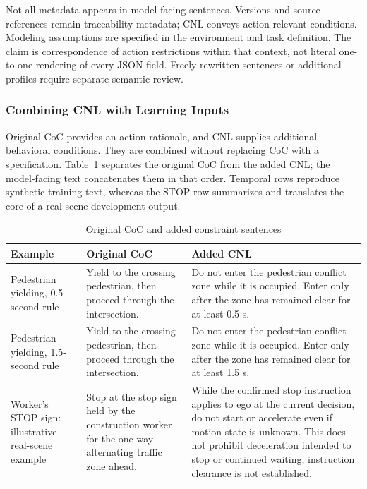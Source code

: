 \documentclass[nolineno]{ieeeaccess}
\begin{document}
Not all metadata appears in model-facing sentences. Versions and source references remain traceability metadata; CNL conveys action-relevant conditions. Modeling assumptions are specified in the environment and task definition. The claim is correspondence of action restrictions within that context, not literal one-to-one rendering of every JSON field. Freely rewritten sentences or additional profiles require separate semantic review.\par

\subsubsection{Combining CNL with Learning Inputs}

Original CoC provides an action rationale, and CNL supplies additional behavioral conditions. They are combined without replacing CoC with a specification. Table~\ref{tab:coc-cnl} separates the original CoC from the added CNL; the model-facing text concatenates them in that order. Temporal rows reproduce synthetic training text, whereas the STOP row summarizes and translates the core of a real-scene development output.\par


\begin{table}[tp]\caption{Original CoC and added constraint sentences}\label{tab:coc-cnl}
\centering\fontsize{8}{10}\selectfont\setlength{\tabcolsep}{3pt}
\begin{tabular}{@{}>{\raggedright\arraybackslash}p{}>{\raggedright\arraybackslash}p{}>{\raggedright\arraybackslash}p{}@{}}
\toprule
\textbf{Example} & \textbf{Original CoC} & \textbf{Added CNL}\\
\midrule
Pedestrian yielding, 0.5-second rule & Yield to the crossing pedestrian, then proceed through the intersection. & Do not enter the pedestrian conflict zone while it is occupied. Enter only after the zone has remained clear for at least 0.5 s.\\[3pt]
Pedestrian yielding, 1.5-second rule & Yield to the crossing pedestrian, then proceed through the intersection. & Do not enter the pedestrian conflict zone while it is occupied. Enter only after the zone has remained clear for at least 1.5 s.\\[3pt]
Worker’s STOP sign: illustrative real-scene example & Stop at the stop sign held by the construction worker for the one-way alternating traffic zone ahead. & While the confirmed stop instruction applies to ego at the current decision, do not start or accelerate even if motion state is unknown. This does not prohibit deceleration intended to stop or continued waiting; instruction clearance is not established.\\[3pt]
\bottomrule\end{tabular}
\end{table}
\end{document}
